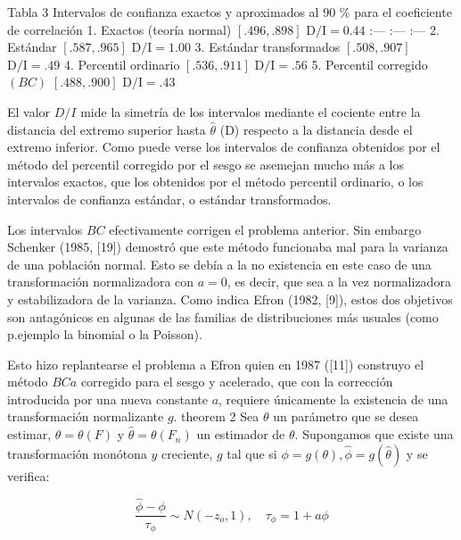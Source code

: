 \documentclass[
]{article}
\begin{document}
Tabla 3
Intervalos de confianza exactos y aproximados al 90 \% para el coeficiente de correlación
\textbar{} 1. Exactos (teoría normal) \textbar{} \([.496, .898]\) \textbar{} \(\mathrm{D} / \mathrm{I}=0.44\) \textbar{}
\textbar{} :--- \textbar{} :--- \textbar{} :--- \textbar{}
\textbar{} 2. Estándar \textbar{} \([.587, .965]\) \textbar{} \(\mathrm{D} / \mathrm{I}=1.00\) \textbar{}
\textbar{} 3. Estándar transformados \textbar{} \([.508, .907]\) \textbar{} \(\mathrm{D} / \mathrm{I}=.49\) \textbar{}
\textbar{} 4. Percentil ordinario \textbar{} \([.536, .911]\) \textbar{} \(\mathrm{D} / \mathrm{I}=.56\) \textbar{}
\textbar{} 5. Percentil corregido \((B C)\) \textbar{} \([.488, .900]\) \textbar{} \(\mathrm{D} / \mathrm{I}=.43\) \textbar{}

El valor \(D / I\) mide la simetría de los intervalos mediante el cociente entre la distancia del extremo superior hasta \(\hat{\theta}\) (D) respecto a la distancia desde el extremo inferior. Como puede verse los intervalos de confianza obtenidos por el método del percentil corregido por el sesgo se asemejan mucho más a los intervalos exactos, que los obtenidos por el método percentil ordinario, o los intervalos de confianza estándar, o estándar transformados.

Los intervalos \(B C\) efectivamente corrigen el problema anterior. Sin embargo Schenker (1985, {[}19{]}) demostró que este método funcionaba mal para la varianza de una población normal. Esto se debía a la no existencia en este caso de una transformación normalizadora con \(a=0\), es decir, que sea a la vez normalizadora y estabilizadora de la varianza. Como indica Efron (1982, {[}9{]}), estos dos objetivos son antagónicos en algunas de las familias de distribuciones más usuales (como p.ejemplo la binomial o la Poisson).

Esto hizo replantearse el problema a Efron quien en 1987 ({[}11{]}) construyo el método \(B C a\) corregido para el sesgo y acelerado, que con la corrección introducida por una nueva constante \(a\), requiere únicamente la existencia de una transformación normalizante \(g\).
theorem 2 Sea \(\theta\) un parámetro que se desea estimar, \(\theta=\theta(F)\) y \(\hat{\theta}=\theta\left(F_{n}\right)\) un estimador de \(\theta\). Supongamos que existe una transformación monótona \(y\) creciente, \(g\) tal que si \(\phi=g(\theta), \hat{\phi}=g(\hat{\theta})\) y se verifica:

\[
\frac{\hat{\phi}-\phi}{\tau_{\phi}} \sim N\left(-z_{o}, 1\right), \quad \tau_{\phi}=1+a \phi
\]
\end{document}
